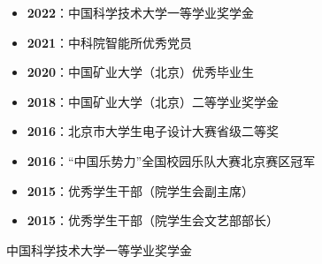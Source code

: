   \begin{itemize}[leftmargin=*]
    \item \textbf{2022}：中国科学技术大学一等学业奖学金
    \item \textbf{2021}：中科院智能所优秀党员
    \item \textbf{2020}：中国矿业大学（北京）优秀毕业生
    \item \textbf{2018}：中国矿业大学（北京）二等学业奖学金
    \item \textbf{2016}：北京市大学生电子设计大赛省级二等奖
    \item \textbf{2016}：“中国乐势力”全国校园乐队大赛北京赛区冠军
    \item \textbf{2015}：优秀学生干部（院学生会副主席）
    \item \textbf{2015}：优秀学生干部（院学生会文艺部部长）
  \end{itemize}

\vspace{2mm}
  中国科学技术大学一等学业奖学金
